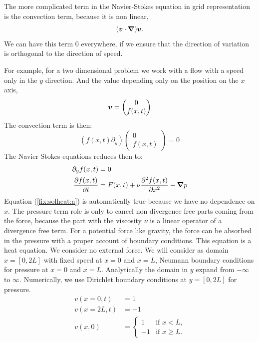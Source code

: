 The more complicated term in the Navier-Stokes equation in grid representation is the convection term, because it is non linear,
\begin{equation}
	({\boldsymbol {v}}\cdot {\boldsymbol {\nabla}}){\boldsymbol {v}}.
\end{equation}
We can have this term $0$ everywhere, if we ensure that the direction of variation is orthogonal to the direction of speed.

For example, for a two dimensional problem we work with a flow with a speed only in the $y$ direction. And the value depending only on the position on the $x$ axis,
\begin{equation}
	{\boldsymbol {v}}=\begin{pmatrix}
	         	0\\f(x,t)
	         \end{pmatrix}
\end{equation}
The convection term is then:
\begin{equation}
	(f(x,t)\partial_{y})\begin{pmatrix}
	         	0\\f(x,t)
	         \end{pmatrix}=0
\end{equation}
The Navier-Stokes equations reduces then to:
\begin{align}
\label{fix:solheat:a}
	\partial_{y}f(x,t)&=0\\
	\frac{\partial f(x,t)}{\partial t}&=F(x,t)+\nu\frac{\partial^2 f(x,t)}{\partial x^2}-{\boldsymbol {\nabla}}p
\end{align}
Equation (\ref{fix:solheat:a}) is automatically true because we have no dependence on $x$.
The pressure term role is only to cancel non divergence free parts coming from the force, because the part with the viscosity $\nu$ is a linear operator
of a divergence free term.
For a potential force like gravity, the force can be absorbed in the pressure with a proper account of boundary conditions.
This equation is a heat equation.
We consider no external force.
We will consider as domain $x=[0,2L]$ with fixed speed at $x=0$ and $x=L$,  Neumann boundary conditions for pressure at $x=0$ and $x=L$.
Analytically the domain in $y$ expand from $-\infty$ to $\infty$. Numerically, we use Dirichlet boundary conditions at $y=[0,2L]$ for pressure.
\begin{align*}
    v(x=0,t)&=1\\
    v(x=2L,t)&=-1\\
    v(x,0)&=\begin{cases}
             1&\text{if $x<L$,}\\
             -1& \text{if $x\geq L$.}
            \end{cases}
\end{align*}

